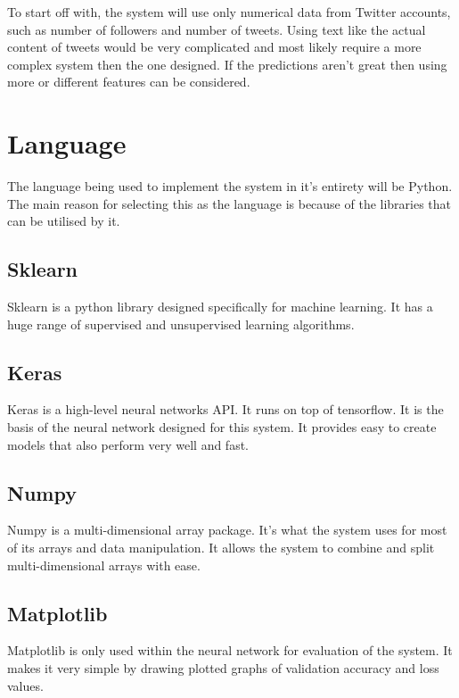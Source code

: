 To start off with, the system will use only numerical data from Twitter accounts, such as number of followers and number of tweets. Using text like the actual content of tweets would be very complicated and most likely require a more complex system then the one designed. If the predictions aren't great then using more or different features can be considered. 

\section{Language}
The language being used to implement the system in it's entirety will be Python. The main reason for selecting this as the language is because of the libraries that can be utilised by it.

\subsection{Sklearn}
Sklearn is a python library designed specifically for machine learning. It has a huge range of supervised and unsupervised learning algorithms. 

\subsection{Keras}
Keras is a high-level neural networks API. It runs on top of tensorflow. It is the basis of the neural network designed for this system. It provides easy to create models that also perform very well and fast.

\subsection{Numpy}
Numpy is a multi-dimensional array package. It's what the system uses for most of its arrays and data manipulation. It allows the system to combine and split multi-dimensional arrays with ease. 

\subsection{Matplotlib}
Matplotlib is only used within the neural network for evaluation of the system. It makes it very simple by drawing plotted graphs of validation accuracy and loss values.















